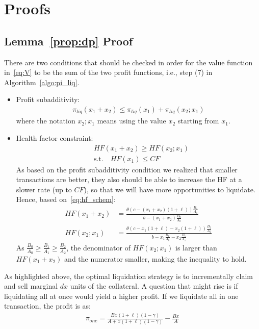 \documentclass[11pt]{article} %
\begin{document}
\section{Proofs}\label{sec:app}
\subsection{Lemma~\ref{prop:dp} Proof}\label{app:dp}
There are two conditions that should be checked in order for the value function in~\eqref{eq:V} to be the sum of the two profit functions, i.e., step (7) in Algorithm~\ref{algo:pi_liq}.
\begin{itemize}
    \item Profit subadditivity:
    \begin{align*}
        \pi_{liq}(x_1+x_2) \leq \pi_{liq}(x_1) + \pi_{liq}(x_2; x_1)
    \end{align*}
where the notation $x_2;x_1$ means using the value $x_2$ starting from $x_1$.
    \item Health factor constraint:
    \begin{align*}
        & HF(x_1+x_2) \geq HF(x_2; x_1) \\
        & \text{s.t.} \quad HF(x_1) \leq CF
    \end{align*}
%
As based on the profit subadditivity condition we realized that smaller transactions are better, they also should be able to increase the HF at a slower rate (up to $CF$), so that we will have more opportunities to liquidate. Hence, based on~\eqref{eq:hf_schem}:
\begin{align*}
    HF(x_1+x_2) &= \frac{\theta(c-(x_1+x_2)(1+\ell))\frac{B_1}{A_1}}{b-(x_1+x_2)\frac{B_0}{A_0}}\\
    HF(x_2;x_1) &= \frac{\theta(c-x_1(1+\ell)-x_2(1+\ell))\frac{B_2}{A_2}}{b-x_1\frac{B_0}{A_0}-x_2\frac{B_1}{A_1}}
\end{align*}
As $\frac{B_0}{A_0}\geq\frac{B_1}{A_1}\geq\frac{B_2}{A_2}$, the denominator of $HF(x_2;x_1)$ is larger than $HF(x_1+x_2)$ and the numerator smaller, making the inequality to hold.
\end{itemize}

As highlighted above, the optimal liquidation strategy is to incrementally claim and sell marginal $dx$ units of the collateral. A question that might rise is if liquidating all at once would yield a higher profit. If we liquidate all in one transaction, the profit is as:
\begin{align*}
    \pi_{one}=\frac{Bx(1+\ell)(1-\gamma)}{A+x(1+\ell)(1-\gamma)}-\frac{Bx}{A}
\end{align*}
\end{document}
